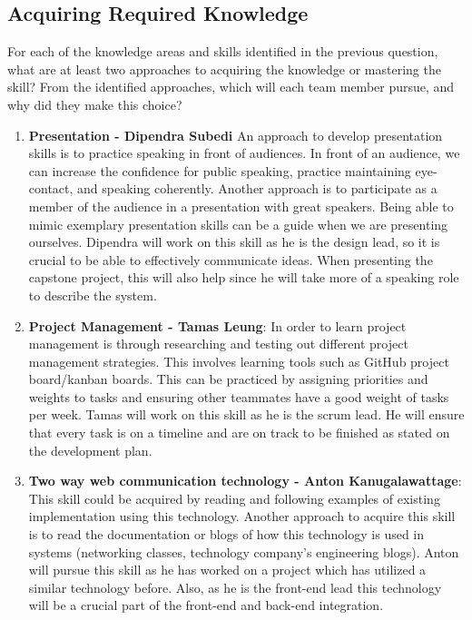 \documentclass[12pt, titlepage]{article}
\begin{document}
\subsection{Acquiring Required Knowledge}

For each of the knowledge areas and skills identified in the previous question, what are at least two approaches to acquiring the knowledge or mastering the skill? From the identified approaches, which will each team member pursue, and why did they make this choice?

\begin{enumerate}

\item \textbf{Presentation - Dipendra Subedi} An approach to develop presentation skills is to practice speaking in front of audiences. In front of an audience, we can increase the confidence for public speaking, practice maintaining eye-contact, and speaking coherently. Another approach is to participate as a member of the audience in a presentation with great speakers. Being able to mimic exemplary presentation skills can be a guide when we are presenting ourselves. Dipendra will work on this skill as he is the design lead, so it is crucial to be able to effectively communicate ideas. When presenting the capstone project, this will also help since he will take more of a speaking role to describe the system.

\item  \textbf{Project Management - Tamas Leung}: In order to learn project management is through researching and testing out different project management strategies. This involves learning tools such as GitHub project board/kanban boards. This can be practiced by assigning priorities and weights to tasks and ensuring other teammates have a good weight of tasks per week. Tamas will work on this skill as he is the scrum lead. He will ensure that every task is on a timeline and are on track to be finished as stated on the development plan.

\item \textbf{Two way web communication technology - Anton Kanugalawattage}: This skill could be acquired by reading and following examples of existing implementation using this technology. Another approach to acquire this skill is to read the documentation or blogs of how this technology is used in systems (networking classes, technology company's engineering blogs). Anton will pursue this skill as he has worked on a project which has utilized a similar technology before. Also, as he is the front-end lead this technology will be a crucial part of the front-end and back-end integration. 


\end{enumerate}
\end{document}
